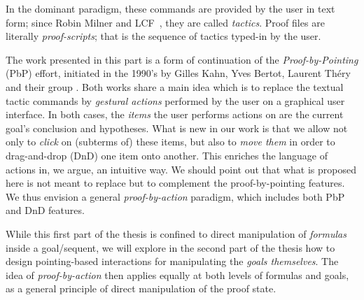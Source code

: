 In the dominant paradigm, these commands are provided by the user in
text form; since Robin Milner and
LCF~\cite{doi:10.1098/rsta.1984.0067}, they are called {\em
tactics}. Proof files are literally {\em proof-scripts}; that is the
sequence of tactics typed-in by the user.
	
	The work presented in this part is a form of continuation of the
	\emph{Proof-by-Pointing} (PbP) effort, initiated in the 1990's by Gilles Kahn,
	Yves Bertot, Laurent Théry and their group \cite{PbP}. Both works share a main
	idea which is to replace the textual tactic commands by {\em gestural actions}
	performed by the user on a graphical user interface. In both cases, the {\em
	items} the user performs actions on are the current goal's conclusion and
	hypotheses. What is new in our work is that we allow not only to {\em click}
	on (subterms of) these items, but also to {\em move them} in order to
	drag-and-drop (DnD) one item onto another. This enriches the language of
	actions in, we argue, an intuitive way. We should point out that what is
	proposed here is not meant to replace but to complement the proof-by-pointing
	features. We thus envision a general {\em proof-by-action} paradigm, which
	includes both PbP and DnD features.

While this first part of the thesis is confined to direct manipulation of
\emph{formulas} inside a goal/sequent, we will explore in the second part of the
thesis how to design pointing-based interactions for manipulating the
\emph{goals themselves}. The idea of \emph{proof-by-action} then applies equally
at both levels of formulas and goals, as a general principle of direct
manipulation of the proof state.


% 
% 
% 
% 
% 


